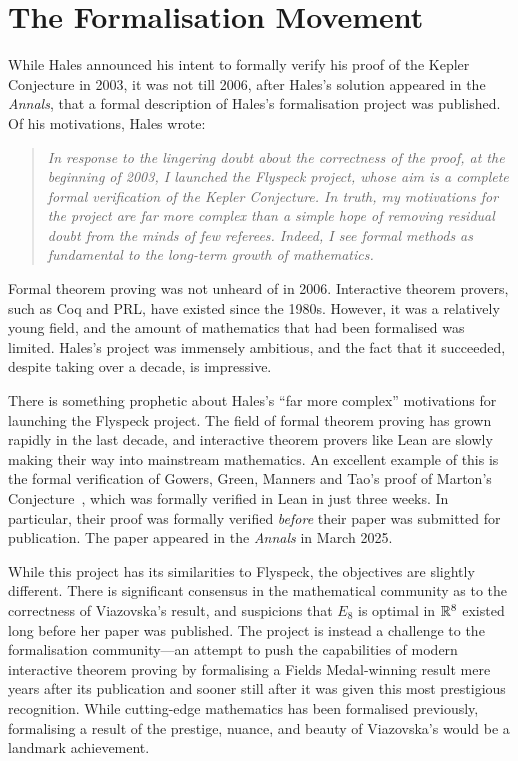 \section{The Formalisation Movement}

While Hales announced his intent to formally verify his proof of the Kepler Conjecture in 2003, it was not till 2006, after Hales's solution appeared in the \textit{Annals}, that a formal description of Hales's formalisation project was published. Of his motivations, Hales wrote:
\begin{quote}
    \textit{In response to the lingering doubt about the correctness of the proof, at the beginning of 2003, I launched the \emph{Flyspeck} project, whose aim is a complete formal verification of the Kepler Conjecture. In truth, my motivations for the project are far more complex than a simple hope of removing residual doubt from the minds of few referees. Indeed, I see formal methods as fundamental to the long-term growth of mathematics.}~\cite{FlyspeckAnnouncement}
\end{quote}
Formal theorem proving was not unheard of in 2006. Interactive theorem provers, such as Coq and PRL, have existed since the 1980s. However, it was a relatively young field, and the amount of mathematics that had been formalised was limited. Hales's project was immensely ambitious, and the fact that it succeeded, despite taking over a decade, is impressive.

There is something prophetic about Hales's ``far more complex'' motivations for launching the Flyspeck project. The field of formal theorem proving has grown rapidly in the last decade, and interactive theorem provers like Lean are slowly making their way into mainstream mathematics. An excellent example of this is the formal verification of Gowers, Green, Manners and Tao's proof of Marton's Conjecture~\cite{PFRPublished}, which was formally verified in Lean in just three weeks. In particular, their proof was formally verified \textit{before} their paper was submitted for publication. The paper appeared in the \textit{Annals} in March 2025.

While this project has its similarities to Flyspeck, the objectives are slightly different. There is significant consensus in the mathematical community as to the correctness of Viazovska's result, and suspicions that $E_8$ is optimal in $\mathbb{R}^8$ existed long before her paper was published. The project is instead a challenge to the formalisation community---an attempt to push the capabilities of modern interactive theorem proving by formalising a Fields Medal-winning result mere years after its publication and sooner still after it was given this most prestigious recognition. While cutting-edge mathematics has been formalised \cite{liquidtensor} previously, formalising a result of the prestige, nuance, and beauty of Viazovska's would be a landmark achievement.

